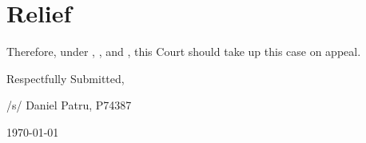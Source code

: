 \documentclass[12pt,\documentclassflag]{michiganCourtOfAppealsBrief}
\begin{document}
\section{Relief}

Therefore, under \cite{MCR 7.305(B)(3)}, \cite{MCR 7.305(B)(5a)}, and \cite{MCR 7.305(B)(5b)}, this Court should take up this case on appeal.



\vspace{1\baselineskip}

{ \setlength{\leftskip}{3.5in}
  Respectfully Submitted,

  /s/ Daniel Patru, P74387

\today

  \setlength{\leftskip}{0pt}}


\newpage\empty%

\pagestyle{fancy}
\fancyhf{}
\fancyhead{}
\fancyfoot{}
\renewcommand\headrule{}

\newcommand{\addLabelsToAllIncludedPages}[1]{%
   \refstepcounter{includepdfpage}%
   \stepcounter{currentpagecounter}%
   \label{#1.\thecurrentpagecounter}}%

\newcommand{\myincludepdf}[2]{%
  \setcounter{currentpagecounter}{0}%
  {appendix/#1.pdf}}%
  
\end{document}
